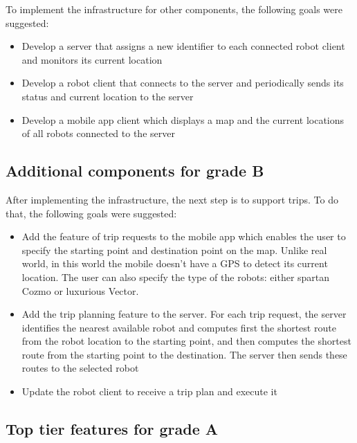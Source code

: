 \documentclass[12pt,a4paper]{article}
\begin{document}
To implement the infrastructure for other components, the following goals were suggested: 

\begin{itemize}
\item Develop a server that assigns a new identifier to each connected robot client and monitors its current location

\item Develop a robot client that connects to the server and periodically sends its status and current location to the server

\item Develop a mobile app client which displays a map and the current locations of all robots connected to the server
\end{itemize}
\subsection{Additional components for grade B} \label{sec:B}

After implementing the infrastructure, the next step is to support trips. To do that, the following goals  were suggested:

\begin{itemize}
\item Add the feature of trip requests to the mobile app which enables the user to specify the starting point and destination point on the map. Unlike real world, in this world the mobile doesn’t have a GPS to detect its current location. The user can also specify the type of the robots: either spartan Cozmo or luxurious Vector. 

\item Add the trip planning feature to the server. For each trip request, the server identifies the nearest available robot and computes first the shortest route from the robot location to the  starting point, and then computes the shortest route from the starting point to the destination. The server then sends these routes to the selected robot

\item Update the robot client to receive a trip plan and execute it

\end{itemize}

\subsection{Top tier features for grade A} \label{sec:A}
\end{document}
